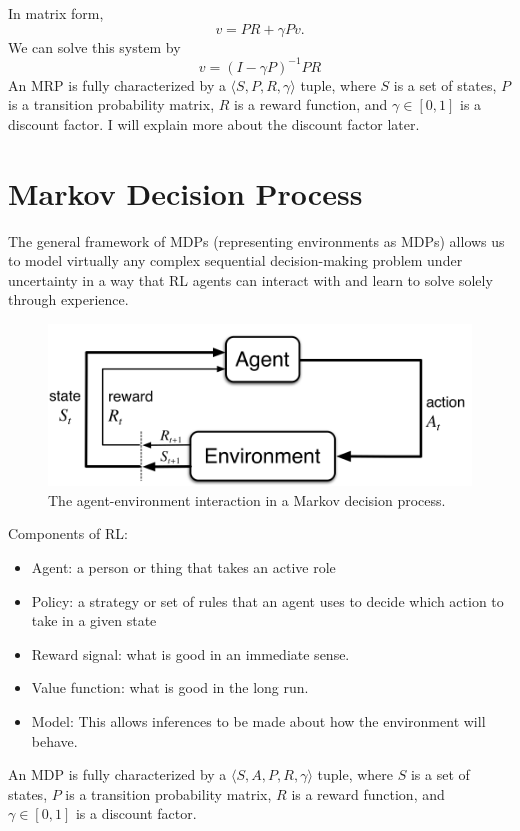 In matrix form,
$$v = PR+\gamma Pv.$$
We can solve this system by
$$v = (I-\gamma P)^{-1}PR$$
An MRP is fully characterized by a $\langle S,P,R,\gamma \rangle$ tuple, where $S$ is a set of states, $P$ is a transition probability matrix, $R$ is a reward function, and $\gamma\in[0,1]$  is a discount factor. I will explain more about the discount factor later. 


\section{Markov Decision Process}

The general framework of MDPs (representing environments as MDPs) allows us to model virtually any complex sequential decision-making problem under uncertainty in a way that RL agents can interact with and learn to solve solely through experience. 

\begin{figure}[h]
	\centering
	\includegraphics[scale=0.3]{./images/mdp.png}
	\caption{The agent-environment interaction in a Markov decision process.}
	\label{fig:mdp_ill}
\end{figure}

Components of RL:
\begin{itemize}
	\item Agent: a person or thing that takes an active role
	\item Policy: a strategy or set of rules that an agent uses to decide which action to take in a given state
	\item Reward signal: what is good in an immediate sense.
	\item Value function: what is good in the long run.
	\item Model: This allows inferences to be made about how the environment will behave.
\end{itemize}
An MDP is fully characterized by a $\langle S,A,P,R,\gamma \rangle$ tuple, where $S$ is a set of states, $P$ is a transition probability matrix, $R$ is a reward function, and $\gamma\in[0,1]$  is a discount factor.


